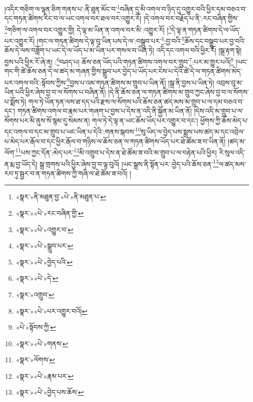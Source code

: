 །འདིར་གཅིག་ལ་ལྷན་ཅིག་གནས་པ་:ནི་ཐུན་མོང་བ་\footnote{«སྣར་»ནི་མཐུན་བྱ་«པེ་»ནི་མཐུན་པ་}བཞིན་དུ་མི་འགལ་བ་ཉིད་དུ་འགྱུར་བའི་ཕྱིར་དམ་བཅའ་བ་དང་གཏན་ཚིགས་རིང་བ་ལ་ཡང་འགལ་བར་ཐལ་བར་འགྱུར་རོ། །དེ་འགལ་བར་བརྗོད་པ་ནི་:རང་བཞིན་གྱིས་\footnote{«སྣར་»«པེ་»རང་བཞིན་གྱི་}གཅིག་ལ་འགལ་བར་འགྱུར་གྱི། དེ་ལྟ་མ་ཡིན་ན་འགལ་བར་མི་:འགྱུར་རོ། །\footnote{«སྣར་»«པེ་»འགྱུར་བ་}དེ་ལྟ་ན་གཏན་ཚིགས་དེ་ལ་ཡོད་པར་འགྱུར་རོ། །གང་ལ་གཏན་ཚིགས་དེ་ལྟ་བུ་ཡིན་པས་དེ་ལ་:བསྒྲུབ་པར་\footnote{«སྣར་»«པེ་»སྒྲུབ་པར་}:བྱ་བའི་\footnote{«སྣར་»«པེ་»བྱེད་པའི་}ཆོས་དང་བསྒྲུབ་པར་བྱ་བའི་ཆོས་དེ་ལས་བཟློག་པ་ཡང་དེ་ལ་ཡོད་པ་མ་ཡིན་པར་གསལ་བ་ཡིན་ཏེ། འདི་དང་འགལ་བའི་ཕྱིར་རོ། །སྒྲ་རྟག་སྟེ། བྱས་པའི་ཕྱིར་རོ་ཞེ་ན། :\footnote{«སྣར་»«པེ་»དེ་}བཤད་པ། ཆོས་ཅན་ཡོད་པའི་གཏན་ཚིགས་འགལ་བར་གྲུབ་\footnote{«སྣར་»འགྲུབ་}:པར་མ་གྱུར་པའོ།\footnote{«སྣར་»«པེ་»པར་འགྱུར་བའོ།} །ཡང་གང་གི་ཚེ་ཆོས་ཅན་དེ་ལ་ཚད་མ་གཞན་གྱིས་སྒྲུབ་པར་བྱེད་པ་ཡོད་པར་ངེས་པ་དེའི་ཚེ་དེ་ལ་གཏན་ཚིགས་མེད་པར་འགལ་བའི་:སྟོབས་ཀྱིས་\footnote{«པེ་»སྟོབས་ཀྱི་}བྱས་པ་འམ་གཏན་ཚིགས་མ་གྲུབ་པ་ཡིན་ནོ། །སྒྲ་ནི་བྱས་པ་ཡིན་ཏེ། འབྲས་བུ་མ་ཡིན་པའི་ཕྱིར་ཞེས་བྱ་བ་ལ་སོགས་པ་བཞིན་ནོ། །དེ་ནི་ཆོས་ཅན་ལ་གཏན་ཚིགས་མ་གྲུབ་ཀྱང་ཞེས་བྱ་བ་ལ་སོགས་པ་སྨོས་ཏེ། གལ་ཏེ་ཡོན་ཏན་ལས་ཐ་དད་པའི་རྫས་ལ་སོགས་པའི་ཆོས་ཅན་ཚད་མས་མ་གྲུབ་པ་ལ་དམ་བཅའ་བ་དང་། གཏན་ཚིགས་འགལ་བ་རྣམ་པར་གཞག་པ་བྱས་པ་དེས་ན་འདི་ནི་སྐྱོན་མ་ཡིན་ནོ། །དེས་འདི་མ་གྲུབ་པ་ལ་སོགས་པར་མི་ནུས་སོ་སྙམ་དུ་སེམས་ན། གལ་ཏེ་དེ་ལྟ་ན་ཡང་ཆོས་ཡོད་པར་འགྱུར་བ་དང་། ཕྱོགས་ཀྱི་ཆོས་མེད་པ་དང་འགལ་བ་དང་མ་གྲུབ་པ་ཡང་ཡིན་པ་དེའི་:གནས་སྐབས་\footnote{«སྣར་»«པེ་»གནས་}སུ་ཡིད་ལ་བྱེད་པས་སྨྲས་པས་ཚད་མ་དང་འབྲེལ་པ་མེད་པར་རྒོལ་བ་དང་ཕྱིར་རྒོལ་བ་གཉིས་ལ་ཆོས་ཅན་ལ་གཏན་ཚིགས་ཡོད་པར་ཐེ་ཚོམ་ཟ་བ་ཡིན་ནོ། །ཚད་མ་ལོག་\footnote{«སྣར་»ལོགས་}པས་ཀྱང་དོན་:མེད་པར་\footnote{«སྣར་»«པེ་»རྣམ་པར་}མི་འགྲུབ་པ་དེས་ན་ཐེ་ཚོམ་ཟ་བའི་མ་གྲུབ་པ་ལ་བརྟེན་པའི་ཕྱིར། རི་སུལ་འདི་ན་རྨ་བྱ་ཡོད་དེ། སྒྲ་གྲགས་པའི་ཕྱིར་ཞེས་བྱ་བ་ལྟ་བུའོ། །ཡང་སྒྲས་ནི་སྟོན་པར་:བྱེད་པའི་ཆོས་ཅན་\footnote{«སྣར་»«པེ་»བྱེད་པས་ཆོས་}ལ་ཚད་མས་རབ་ཏུ་སྦྱར་བ་ན་གཏན་ཚིགས་ཀྱི་གཞི་ལ་ཐེ་ཚོམ་ཟ་བའོ། །
